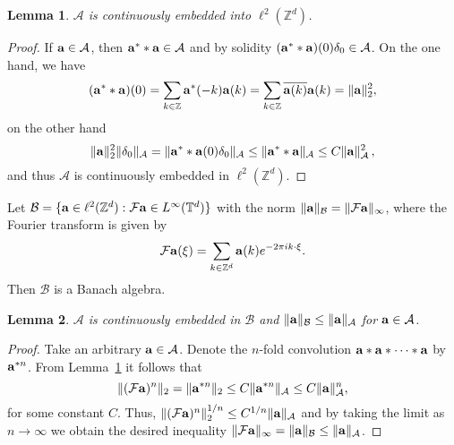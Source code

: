 \documentclass[12pt]{amsart}
\newtheorem{lemma}{Lemma}[section]
\theoremstyle{definition}
\theoremstyle{remark}
\numberwithin{equation}{section}
\def\cF{\mathcal{F}}              %
\def\cB{\mathcal{B}}
\def\cA{\mathcal{A}}
\def\bZ{{\mathbb{Z}}}
\def\bT{{\mathbb{T}}}
\def\zd{\bZ^d}
\def\cF{\mathcal{F}}              %
\def\cB{\mathcal{B}}
\def\cA{\mathcal{A}}
\newcommand{\bba}{{\bf a}}
\newcommand{\bz}{\mathbb{Z}}
\newcommand{\Cal}{\mathcal}
\newcommand{\ov}{\overline}
\newcommand{\el}{{\ell}^2(\zd)}
\newcommand{\ac}{\Cal A}
\begin{document}


\begin{lemma}\label{al2}
 $\ac $ is continuously  embedded into $\el$.
\end{lemma}
\begin{proof} If  $\bba\in \ac$, then  $\bba^**\bba\in \ac$ and by solidity
  $(\bba^* \ast \bba) (0) \delta _0 \in \cA $. On the one hand, we have
\[
(\bba^**\bba )(0)=\sum_{k\in\bz}\bba^*(-k)\bba(k)=\sum_{k\in\bz}\ov{\bba(k)}\bba(k)=\|\bba\|_2^2,
\]
on the other hand $$ \|\bba\|_2^2 \|\delta _0\|_{\cA } =
\|\bba^*\ast \bba(0) \delta _0 \|_{\cA } \leq \|\bba^* \ast \bba
\|_{\cA } \leq C \|\bba\|_{\cA } ^2 \, , $$ and thus $\cA $ is
continuously embedded in $\ell ^2(\zd )$.
\end{proof}

Let $\Cal B=\{\bba\in\el : \Cal F \bba\in L^\infty (\bT ^d)\}$
with the norm $\|\bba\|_{\cB  } = \|\cF \bba\|_\infty $, where the
Fourier transform is given by
\[
\Cal F \bba(\xi)=\sum_{k\in\zd }\bba(k)e^{-2\pi i k\cdot \xi}.
\]
Then $\Cal B$ is a Banach algebra. %

\begin{lemma}\label {ab}
$\ac $ is continuously embedded in $\Cal B$ and $\|\bba\|_{\Cal
B}\le \|\bba\|_\ac$ for $\bba\in\ac$.
\end{lemma}
\begin{proof}
Take an arbitrary $\bba\in\ac$. Denote the $n$-fold convolution
$\bba*\bba*\dots*\bba$ by $\bba^{*n}$. From Lemma~\ref{al2}  it follows that
\[
\|(\Cal F \bba)^n\|_2=\|\bba^{*n}\|_2\le C\|\bba^{*n}\|_\ac\le
C\|\bba\|^n_\ac,
\]
for some constant $C$. Thus, $\|(\Cal F \bba)^n\|_2^{1/n}\le
C^{1/n}\|\bba\|_\ac$ and by taking the limit as $n\to \infty$
we obtain the desired inequality $\|\Cal F
\bba\|_\infty=\|\bba\|_{\cB } \le \|\bba\|_\ac$.
\end{proof}
\end{document}
